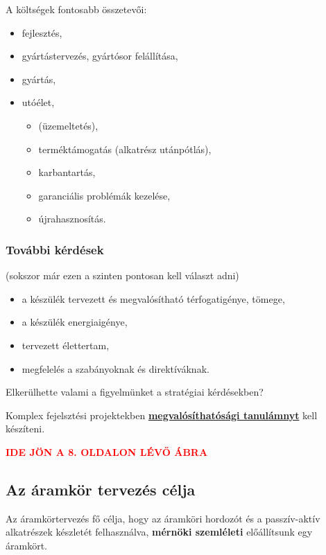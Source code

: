 \documentclass[11pt]{article}
\begin{document}
				A költségek fontosabb összetevői:

				\begin{itemize}
					\item fejlesztés,
					\item gyártástervezés, gyártósor felállítása,
					\item gyártás,
					\item utóélet,
					\begin{itemize}
						\item (üzemeltetés),
						\item terméktámogatás (alkatrész utánpótlás),
						\item karbantartás,
						\item garanciális problémák kezelése,
						\item újrahasznosítás.
					\end{itemize}				
				\end{itemize}

			\subsubsection{További kérdések}

				(sokszor már ezen a szinten pontosan kell választ adni)

				\begin{itemize}
					\item a készülék tervezett és megvalósítható térfogatigénye, tömege,
					\item a készülék energiaigénye, 
					\item tervezett élettertam,
					\item megfelelés a szabányoknak és direktíváknak.
				\end{itemize}

				Elkerülhette valami a figyelmünket a stratégiai kérdésekben?

				Komplex fejelsztési projektekben \textbf{\underline{megvalósíthatósági tanulámnyt}} kell készíteni.

			\textbf{\textcolor{red}{IDE JÖN A 8. OLDALON LÉVŐ ÁBRA}}

		\subsection{Az áramkör tervezés célja}
			
			Az áramkörtervezés fő célja, hogy az áramköri hordozót és a passzív-aktív alkatrészek készletét felhasználva, \textbf{mérnöki szemléleti} előállítsunk egy áramkört.
\end{document}
